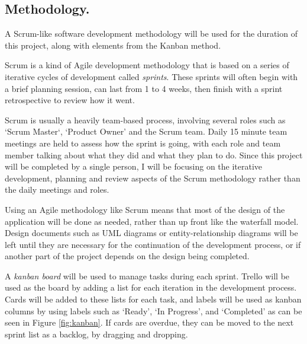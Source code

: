 \documentclass[a4paper, 12pt]{article}
\begin{document}
\subsection{Methodology.}
A Scrum-like software development methodology will be used for the duration of this project, along with elements from the Kanban method.

Scrum is a kind of Agile development methodology that is based on a series of iterative cycles of development called \emph{sprints}. These sprints will often begin with a brief planning session, can last from 1 to 4 weeks, then finish with a sprint retrospective to review how it went.

Scrum is usually a heavily team-based process, involving several roles such as `Scrum Master`, `Product Owner' and the Scrum team. Daily 15 minute team meetings are held to assess how the sprint is going, with each role and team member talking about what they did and what they plan to do. Since this project will be completed by a single person, I will be focusing on the iterative development, planning and review aspects of the Scrum methodology rather than the daily meetings and roles.


Using an Agile methodology like Scrum means that most of the design of the application will be done as needed, rather than up front like the waterfall model. Design documents such as UML diagrams or entity-relationship diagrams will be left until they are necessary for the continuation of the development process, or if another part of the project depends on the design being completed.

A \emph{kanban board} will be used to manage tasks during each sprint. Trello will be used as the board by adding a list for each iteration in the development process. Cards will be added to these lists for each task, and labels will be used as kanban columns by using labels such as `Ready', `In Progress', and `Completed' as can be seen in Figure \ref{fig:kanban}. If cards are overdue, they can be moved to the next sprint list as a backlog, by dragging and dropping.

\end{document}
